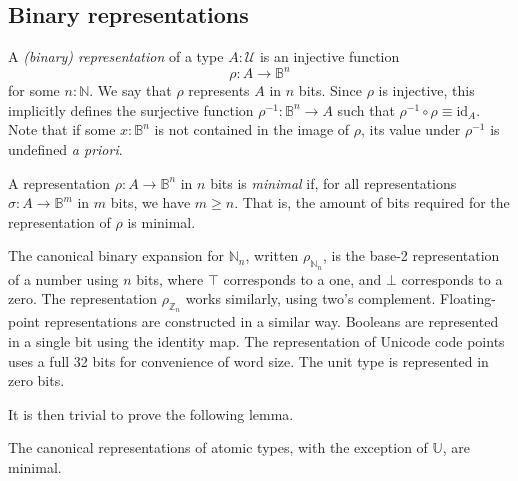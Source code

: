 \documentclass[11pt]{book}
\begin{document}
\subsection{Binary representations}
\begin{defn}
    A \textit{(binary) representation} of a type \( A : \mathcal U \) is an injective function
    \[ \rho : A \to \mathbb B^n \]
    for some \( n : \mathbb N \).
    We say that \( \rho \) represents \( A \) in \( n \) bits.
    Since \( \rho \) is injective, this implicitly defines the surjective function \( \rho^{-1} : \mathbb B^n \to A \) such that \( \rho^{-1} \circ \rho \equiv \mathrm{id}_A \).
    Note that if some \( x : \mathbb B^n \) is not contained in the image of \( \rho \), its value under \( \rho^{-1} \) is undefined \textit{a priori}.
\end{defn}
\begin{defn}
    A representation \( \rho : A \to \mathbb B^n \) in \( n \) bits is \textit{minimal} if, for all representations \( \sigma : A \to \mathbb B^m \) in \( m \) bits, we have \( m \geq n \).
    That is, the amount of bits required for the representation of \( \rho \) is minimal.
\end{defn}
\begin{defn}
    The canonical binary expansion for \( \mathbb N_n \), written \( \rho_{\mathbb N_n} \), is the base-2 representation of a number using \( n \) bits, where \( \top \) corresponds to a one, and \( \bot \) corresponds to a zero.
    The representation \( \rho_{\mathbb Z_n} \) works similarly, using two's complement.
    Floating-point representations are constructed in a similar way.
    Booleans are represented in a single bit using the identity map.
    The representation of Unicode code points uses a full 32 bits for convenience of word size.
    The unit type is represented in zero bits.
\end{defn}
It is then trivial to prove the following lemma.
\begin{lem}
    The canonical representations of atomic types, with the exception of \( \mathbb U \), are minimal.
\end{lem}
\end{document}
